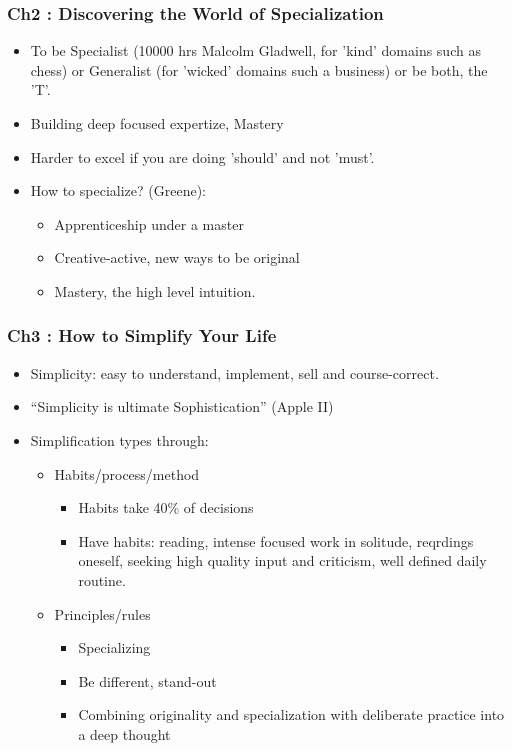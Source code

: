\begin{frame}[fragile]\frametitle{Ch2 : Discovering the World of Specialization}

\begin{itemize}
\item To be Specialist (10000 hrs Malcolm Gladwell, for 'kind' domains such as chess) or Generalist (for 'wicked' domains such a business) or be both, the 'T'.
\item Building deep focused expertize, Mastery
\item Harder to excel if you are doing 'should' and not 'must'.
\item How to specialize? (Greene):
	\begin{itemize}
	\item Apprenticeship under a master
	\item Creative-active, new ways to be original
	\item Mastery, the high level intuition.
	\end{itemize}
\end{itemize}

\end{frame}

\begin{frame}[fragile]\frametitle{Ch3 : How to Simplify Your Life}

\begin{itemize}
\item Simplicity: easy to understand, implement, sell and course-correct.
\item ``Simplicity is ultimate Sophistication'' (Apple II)
\item Simplification types through:
	\begin{itemize}
	\item Habits/process/method
		\begin{itemize}
		\item Habits take 40\% of decisions
		\item Have habits: reading, intense focused work in solitude, reqrdings oneself, seeking high quality input and criticism, well defined daily routine.		
		\end{itemize}	
	\item Principles/rules
		\begin{itemize}
		\item Specializing
		\item Be different, stand-out
		\item Combining originality and specialization with deliberate practice into a deep thought
		\end{itemize}		
	\end{itemize}
\end{itemize}

\end{frame}




